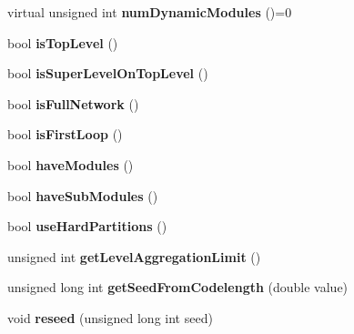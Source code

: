 \begin{DoxyCompactItemize}
virtual unsigned int {\bfseries num\+Dynamic\+Modules} ()=0
\item 
\mbox{\label{classInfomapBase_a83dc486ce25757727437aaefa39a12a0}} 
bool {\bfseries is\+Top\+Level} ()
\item 
\mbox{\label{classInfomapBase_a6aa3e0a34a98efa520e68301c6e7f2fd}} 
bool {\bfseries is\+Super\+Level\+On\+Top\+Level} ()
\item 
\mbox{\label{classInfomapBase_a14711330a837a9063a6548f783570c18}} 
bool {\bfseries is\+Full\+Network} ()
\item 
\mbox{\label{classInfomapBase_a2612f2f214e5673f89973c7f421d15cc}} 
bool {\bfseries is\+First\+Loop} ()
\item 
\mbox{\label{classInfomapBase_a080bdf84b2d311b3348ac8548b832df4}} 
bool {\bfseries have\+Modules} ()
\item 
\mbox{\label{classInfomapBase_ab381afa30992135f54611f8f1c5797dc}} 
bool {\bfseries have\+Sub\+Modules} ()
\item 
\mbox{\label{classInfomapBase_afd4a4685d08ee59f39e65734d28cd3f1}} 
bool {\bfseries use\+Hard\+Partitions} ()
\item 
\mbox{\label{classInfomapBase_a8bd3b453a38dd0af27aa664e5e4d73ce}} 
unsigned int {\bfseries get\+Level\+Aggregation\+Limit} ()
\item 
\mbox{\label{classInfomapBase_ab2f0af29d538027add1d82464dd04508}} 
unsigned long int {\bfseries get\+Seed\+From\+Codelength} (double value)
\item 
\mbox{\label{classInfomapBase_afc239c6037c43021c79c6e5f997d7be6}} 
void {\bfseries reseed} (unsigned long int seed)
\end{DoxyCompactItemize}
